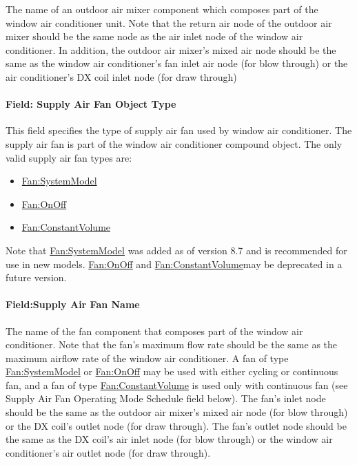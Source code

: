 The name of an outdoor air mixer component which composes part of the window air conditioner unit. Note that the return air node of the outdoor air mixer should be the same node as the air inlet node of the window air conditioner. In addition, the outdoor air mixer's mixed air node should be the same as the window air conditioner's fan inlet air node (for blow through) or the air conditioner's DX coil inlet node (for draw through)

\paragraph{Field: Supply Air Fan Object Type}\label{field-supply-air-fan-object-type-4}

This field specifies the type of supply air fan used by window air conditioner. The supply air fan is part of the window air conditioner compound object. The only valid supply air fan types are:

\begin{itemize}
\item
  \hyperref[fansystemmodel]{Fan:SystemModel}
\item
  \hyperref[fanonoff]{Fan:OnOff}
\item
  \hyperref[fanconstantvolume]{Fan:ConstantVolume}
\end{itemize}

Note that \hyperref[fansystemmodel]{Fan:SystemModel} was added as of version 8.7 and is recommended for use in new models.  \hyperref[fanonoff]{Fan:OnOff} and \hyperref[fanconstantvolume]{Fan:ConstantVolume}may be deprecated in a future version.

\paragraph{Field:Supply Air Fan Name}\label{fieldsupply-air-fan-name}

The name of the fan component that composes part of the window air conditioner. Note that the fan's maximum flow rate should be the same as the maximum airflow rate of the window air conditioner. A fan of type \hyperref[fansystemmodel]{Fan:SystemModel} or \hyperref[fanonoff]{Fan:OnOff} may be used with either cycling or continuous fan, and a fan of type \hyperref[fanconstantvolume]{Fan:ConstantVolume} is used only with continuous fan (see Supply Air Fan Operating Mode Schedule field below). The fan's inlet node should be the same as the outdoor air mixer's mixed air node (for blow through) or the DX coil's outlet node (for draw through). The fan's outlet node should be the same as the DX coil's air inlet node (for blow through) or the window air conditioner's air outlet node (for draw through).

